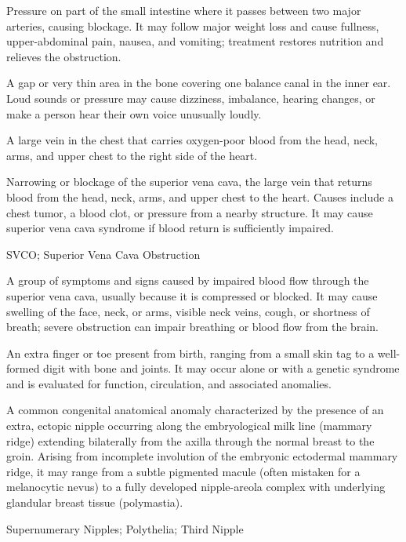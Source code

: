  Pressure on part of the small intestine where it passes between two major arteries, causing blockage. It may follow major weight loss and cause fullness, upper-abdominal pain, nausea, and vomiting; treatment restores nutrition and relieves the obstruction.

 A gap or very thin area in the bone covering one balance canal in the inner ear. Loud sounds or pressure may cause dizziness, imbalance, hearing changes, or make a person hear their own voice unusually loudly.

 A large vein in the chest that carries oxygen-poor blood from the head, neck, arms, and upper chest to the right side of the heart.

 Narrowing or blockage of the superior vena cava, the large vein that returns blood from the head, neck, arms, and upper chest to the heart. Causes include a chest tumor, a blood clot, or pressure from a nearby structure. It may cause superior vena cava syndrome if blood return is sufficiently impaired.

\synonyms
SVCO; Superior Vena Cava Obstruction

 A group of symptoms and signs caused by impaired blood flow through the superior vena cava, usually because it is compressed or blocked. It may cause swelling of the face, neck, or arms, visible neck veins, cough, or shortness of breath; severe obstruction can impair breathing or blood flow from the brain.

 An extra finger or toe present from birth, ranging from a small skin tag to a well-formed digit with bone and joints. It may occur alone or with a genetic syndrome and is evaluated for function, circulation, and associated anomalies.

 A common congenital anatomical anomaly characterized by the presence of an extra, ectopic nipple occurring along the embryological milk line (mammary ridge) extending bilaterally from the axilla through the normal breast to the groin. Arising from incomplete involution of the embryonic ectodermal mammary ridge, it may range from a subtle pigmented macule (often mistaken for a melanocytic nevus) to a fully developed nipple-areola complex with underlying glandular breast tissue (polymastia).

\synonyms
Supernumerary Nipples; Polythelia; Third Nipple

